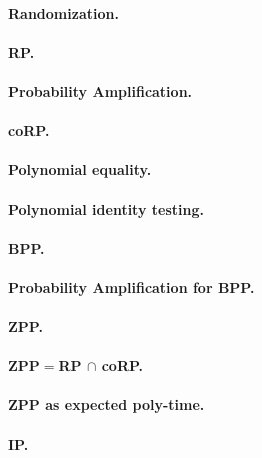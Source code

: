 \documentclass[11pt,a4paper]{article}
\theoremstyle{definition}
\begin{document}
\paragraph{Randomization.}

\paragraph{RP.}

\paragraph{Probability Amplification.}

\paragraph{coRP.}

\paragraph{Polynomial equality.}
\paragraph{Polynomial identity testing.}

\paragraph{BPP.}

\paragraph{Probability Amplification for BPP.}

\paragraph{ZPP.}

\paragraph{ZPP$=$RP $\cap$ coRP.}

\paragraph{ZPP as expected poly-time.}

\paragraph{IP.}
\end{document}
